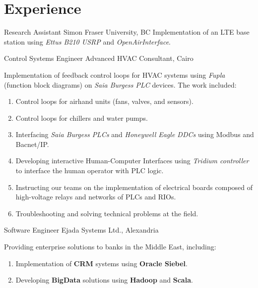 \documentclass[letterpaper]{twentysecondcv} %
\begin{document}

\section{Experience}

\begin{twenty}
               {Research Assistant}
               {Simon Fraser University, BC}
               {Implementation of an LTE base station using \textit{Ettus B210 USRP} and \textit{OpenAirInterface}.
               }

               {Control Systems Engineer}
               {Advanced HVAC Consultant, Cairo}
               {Implementation of feedback control loops for HVAC systems using \textit{Fupla} (function block diagrams) on 
                \textit{Saia Burgess PLC} devices. The work included:
                \begin{enumerate}
                    \item{Control loops for airhand units (fans, valves, and sensors).}
                    \item{Control loops for chillers and water pumps.}
                    \item{Interfacing \textit{Saia Burgess PLCs} and \textit{Honeywell Eagle DDCs} using 
                          Modbus and Bacnet/IP.}
                    \item{Developing interactive Human-Computer Interfaces using \textit{Tridium controller}
                          to interface the human operator with PLC logic.}
                    \item{Instructing our teams on the implementation of electrical boards composed of
                          high-voltage relays and networks of PLCs and RIOs.}
                    \item{Troubleshooting and solving technical problems at the field.}
                \end{enumerate}
               }

               {Software Engineer}
               {Ejada Systems Ltd., Alexandria}
               {Providing enterprise solutions to banks in the Middle East, including:
                \begin{enumerate}
                    \item Implementation of \textbf{CRM} systems using \textbf{Oracle Siebel}.
                    \item Developing \textbf{BigData} solutions using
                          \textbf{Hadoop} and \textbf{Scala}.
                \end{enumerate}}


\end{twenty}
\end{document}
